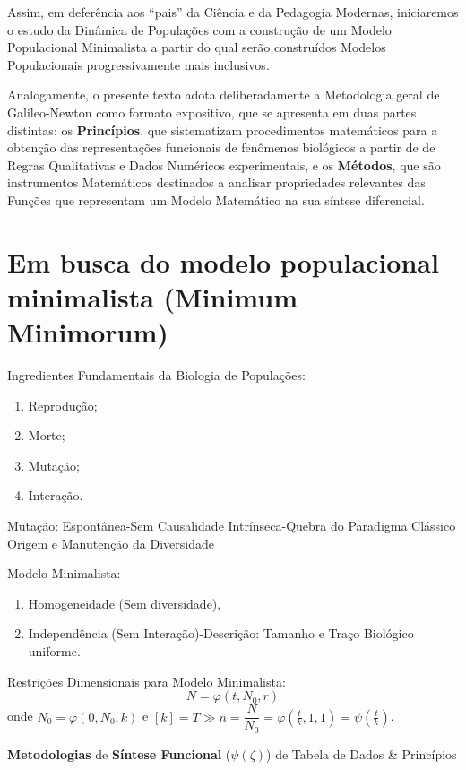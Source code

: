    Assim, em deferência aos ``pais'' da Ciência e da Pedagogia Modernas, iniciaremos o estudo da Dinâmica de Populações com a construção de um Modelo Populacional Minimalista a partir do qual serão construídos Modelos Populacionais progressivamente mais inclusivos.

    Analogamente, o presente texto adota deliberadamente a Metodologia geral de Galileo-Newton como formato expositivo, que se apresenta em duas partes distintas: os \textbf{Princípios}, que sistematizam procedimentos matemáticos para a obtenção das representações funcionais de fenômenos biológicos a partir de de Regras Qualitativas e Dados Numéricos experimentais, e os \textbf{Métodos}, que são instrumentos Matemáticos destinados a analisar propriedades relevantes das Funções que representam um Modelo Matemático na sua síntese diferencial.

\section{Em busca do modelo populacional minimalista (Minimum Minimorum)}

Ingredientes Fundamentais da Biologia de Populações:

\begin{enumerate}
\item Reprodução;
\item Morte;
\item Mutação;
\item Interação.
\end{enumerate}

Mutação: Espontânea-Sem Causalidade Intrínseca-Quebra do Paradigma Clássico Origem e Manutenção da Diversidade

Modelo Minimalista:

\begin{enumerate}
\item Homogeneidade (Sem diversidade),
\item Independência (Sem Interação)-Descrição: Tamanho e Traço Biológico uniforme.
\end{enumerate}

Restrições Dimensionais para Modelo Minimalista:
\[N = \varphi(t, N_0, r)\]
onde
\(N_0 = \varphi(0, N_0, k)\) e \([k] = T \gg n = \dfrac{N}{N_0} = \varphi\left(\frac{t}{k}, 1, 1\right) = \psi\left(\frac{t}{k}\right)\).

\textbf{Metodologias} de \textbf{Síntese Funcional} (\(\psi(\zeta)\)) de Tabela de Dados \& Princípios

